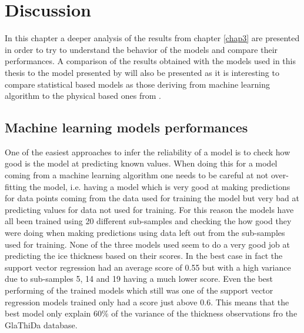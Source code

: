 \chapter{Discussion}\label{disc}
\thispagestyle{plain}
In this chapter a deeper analysis of the results from chapter \ref{chap3} are presented in order to try to understand the behavior of the models and compare their performances. A comparison of the results obtained with the models used in this thesis to the model presented by \cite{Farinotti2019} will also be presented as it is interesting to compare statistical based models as those deriving from machine learning algorithm to the physical based ones from  \cite{Farinotti2019}.

\section{Machine learning models performances}\label{MLcomp}

One of the easiest approaches to infer the reliability of a model is to check how good is the model at predicting known values. When doing this for a model coming from a machine learning algorithm one needs to be careful at not over-fitting the model, i.e. having a model which is very good at making predictions for data points coming from the data used for training the model but very bad at predicting values for data not used for training. For this reason the models have all been trained using 20 different sub-samples and checking the how good they were doing when making predictions using data left out from the sub-samples used for training.
None of the three models used seem to do a very good job at predicting the ice thickness based on their scores. In the best case in fact the support vector regression had an average score of 0.55 but with a high variance due to sub-samples 5, 14 and 19 having a much lower score. Even the best performing of the trained models which still was one of the support vector regression models trained only had a score just above 0.6. This means that the best model only explain 60\% of the variance of the thickness observations fro the GlaThiDa database.

